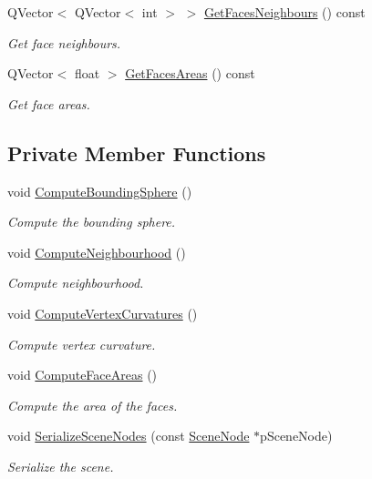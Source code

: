 \begin{DoxyCompactItemize}
Q\+Vector$<$ Q\+Vector$<$ int $>$ $>$ \hyperlink{class_serialized_scene_geometry_afe0b256e3066e146f7961939848bd91b}{Get\+Faces\+Neighbours} () const 
\begin{DoxyCompactList}\small\item\em Get face neighbours. \end{DoxyCompactList}\item 
Q\+Vector$<$ float $>$ \hyperlink{class_serialized_scene_geometry_acfd37aaa9a0ac776a428e9ba8d60a0ed}{Get\+Faces\+Areas} () const 
\begin{DoxyCompactList}\small\item\em Get face areas. \end{DoxyCompactList}\end{DoxyCompactItemize}
\subsection*{Private Member Functions}
\begin{DoxyCompactItemize}
\item 
void \hyperlink{class_serialized_scene_geometry_ac23af9aecd5e5a724bd15685f2d38adb}{Compute\+Bounding\+Sphere} ()
\begin{DoxyCompactList}\small\item\em Compute the bounding sphere. \end{DoxyCompactList}\item 
void \hyperlink{class_serialized_scene_geometry_a86e4d01ff58108ae0b1d7e640b4d2440}{Compute\+Neighbourhood} ()
\begin{DoxyCompactList}\small\item\em Compute neighbourhood. \end{DoxyCompactList}\item 
void \hyperlink{class_serialized_scene_geometry_ad319a1fd95998ac67e68a53d8f0cbfec}{Compute\+Vertex\+Curvatures} ()
\begin{DoxyCompactList}\small\item\em Compute vertex curvature. \end{DoxyCompactList}\item 
void \hyperlink{class_serialized_scene_geometry_ad359e09e3ffcb3c5ed17534ec552f9ed}{Compute\+Face\+Areas} ()
\begin{DoxyCompactList}\small\item\em Compute the area of the faces. \end{DoxyCompactList}\item 
void \hyperlink{class_serialized_scene_geometry_aaae5c1ed47b4c9d8f9cea063c7f622a6}{Serialize\+Scene\+Nodes} (const \hyperlink{class_scene_node}{Scene\+Node} $\ast$p\+Scene\+Node)
\begin{DoxyCompactList}\small\item\em Serialize the scene. \end{DoxyCompactList}\end{DoxyCompactItemize}
